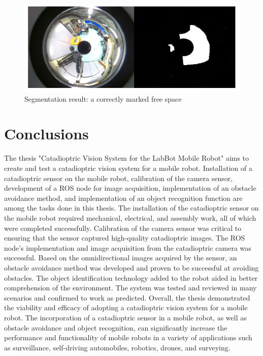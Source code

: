 \documentclass[11pt, a4paper, openany]{book}
\begin{document}
 \begin{figure}[H]
    \centering
    \includegraphics[scale=0.9]{Labbot&ele/w6.png}
    \caption{Segmentation result: a correctly marked free space }
    \label{fig:print} 
\end{figure}



\section{Conclusions}
The thesis "Catadioptric Vision System for the LabBot Mobile Robot" aims to create and test a catadioptric vision system for a mobile robot. Installation of a catadioptric sensor on the mobile robot, calibration of the camera sensor, development of a ROS node for image acquisition, implementation of an obstacle avoidance method, and implementation of an object recognition function are among the tasks done in this thesis.\newline
The installation of the catadioptric sensor on the mobile robot required mechanical, electrical, and assembly work, all of which were completed successfully. Calibration of the camera sensor was critical to ensuring that the sensor captured high-quality catadioptric images. The ROS node's implementation and image acquisition from the catadioptric camera was successful.\newline
Based on the omnidirectional images acquired by the sensor, an obstacle avoidance method was developed and proven to be successful at avoiding obstacles. The object identification technology added to the robot aided in better comprehension of the environment.
The system was tested and reviewed in many scenarios and confirmed to work as predicted. Overall, the thesis demonstrated the viability and efficacy of adopting a catadioptric vision system for a mobile robot.\newline
The incorporation of a catadioptric sensor in a mobile robot, as well as obstacle avoidance and object recognition, can significantly increase the performance and functionality of mobile robots in a variety of applications such as surveillance, self-driving automobiles, robotics, drones, and surveying.\newline
    


\end{document}
